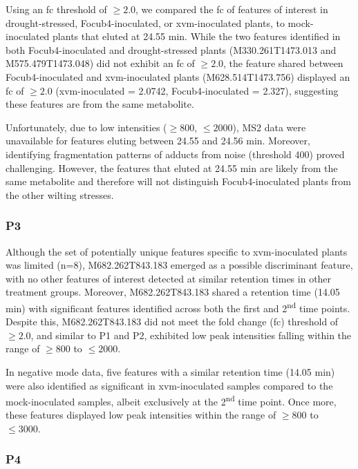 Using an \ac{fc} threshold of $\ge2.0$, we compared the \ac{fc} of features of interest in drought-stressed, \ac{Focub4}-inoculated, or \ac{xvm}-inoculated plants, to mock-inoculated plants that eluted at 24.55 min. While the two features identified in both \ac{Focub4}-inoculated and drought-stressed plants (M330.261T1473.013 and M575.479T1473.048) did not exhibit an \ac{fc} of $\geq2.0$, the feature shared between \ac{Focub4}-inoculated and \ac{xvm}-inoculated plants (M628.514T1473.756) displayed an \ac{fc} of $\geq2.0$ (\ac{xvm}-inoculated = 2.0742, \ac{Focub4}-inoculated = 2.327), suggesting these features are from the same metabolite. 
 
Unfortunately, due to low intensities ($\geq800$, $\leq2000$), MS2 data were unavailable for features eluting between 24.55 and 24.56 min. Moreover, identifying fragmentation patterns of adducts from noise (threshold 400) proved challenging. However, the features that eluted at 24.55 min are likely from the same metabolite and therefore will not distinguish \ac{Focub4}-inoculated plants from the other wilting stresses.

\subsubsection{P3}

Although the set of potentially unique features specific to \ac{xvm}-inoculated plants was limited (n=8), M682.262T843.183 emerged as a possible discriminant feature, with no other features of interest detected at similar retention times in other treatment groups. Moreover, M682.262T843.183 shared a retention time (14.05 min) with significant features identified across both the first and 2\textsuperscript{nd} time points. Despite this, M682.262T843.183 did not meet the fold change (\ac{fc}) threshold of $\geq2.0$, and similar to P1 and P2, exhibited low peak intensities falling within the range of $\geq800$ to $\leq2000$.

In negative mode data, five features with a similar retention time (14.05 min) were also identified as significant in \ac{xvm}-inoculated samples compared to the mock-inoculated samples, albeit exclusively at the 2\textsuperscript{nd} time point. Once more, these features displayed low peak intensities within the range of $\geq800$ to $\leq3000$.

\subsubsection{P4}

